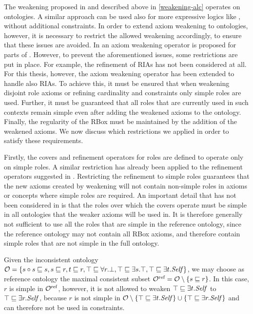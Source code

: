 The weakening proposed in \cite{troquard2018repairing} and described above in \cref{weakening-alc} operates on \ALC ontologies. A similar approach can be used also for more expressive logics like \ALCHOIQ, without additional constraints. In order to extend axiom weakening to \SROIQ ontologies, however, it is necessary to restrict the allowed weakening accordingly, to ensure that these issues are avoided. In \cite{confalonieri2020towards} an axiom weakening operator is proposed for parts of \SROIQ. However, to prevent the aforementioned issues, some restrictions are put in place. For example, the refinement of RIAs has not been considered at all. For this thesis, however, the axiom weakening operator has been extended to handle also RIAs. To achieve this, it must be ensured that when weakening disjoint role axioms or refining cardinality and \self constraints only simple roles are used. Further, it must be guaranteed that all roles that are currently used in such contexts remain simple even after adding the weakened axioms to the ontology. Finally, the regularity of the RBox must be maintained by the addition of the weakened axioms. We now discuss which restrictions we applied in order to satisfy these requirements.

Firstly, the covers and refinement operators for roles are defined to operate only on simple roles. A similar restriction has already been applied to the refinement operators suggested in \cite{confalonieri2020towards}. Restricting the refinement to simple roles guarantees that the new axioms created by weakening will not contain non-simple roles in axioms or concepts where simple roles are required. An important detail that has not been considered in \cite{confalonieri2020towards} is that the roles over which the covers operate must be simple in all ontologies that the weaker axioms will be used in. It is therefore generally not sufficient to use all the roles that are simple in the reference ontology, since the reference ontology may not contain all RBox axioms, and therefore contain simple roles that are not simple in the full ontology.

\begin{example}
  Given the inconsistent ontology $\mathcal{O} = \{ s \circ s \sqsubseteq s, s \sqsubseteq r, t \sqsubseteq r, \top \sqsubseteq \forall r.\bot, \top \sqsubseteq \exists s.\top, \top \sqsubseteq \exists t.\mathit{Self} \}$, we may choose as reference ontology the maximal consistent subset ${\mathcal{O}^\textnormal{ref}} = \mathcal{O} \setminus \{ s \sqsubseteq r \}$. In this case, $r$ is simple in ${\mathcal{O}^\textnormal{ref}}$, however, it is not allowed to weaken $\top \sqsubseteq \exists t.\mathit{Self}$ to $\top \sqsubseteq \exists r.\mathit{Self}$, because $r$ is not simple in $\mathcal{O} \setminus \{ \top \sqsubseteq \exists t.\mathit{Self} \} \cup \{ \top \sqsubseteq \exists r.\mathit{Self} \}$ and can therefore not be used in \self constraints.
\end{example}

